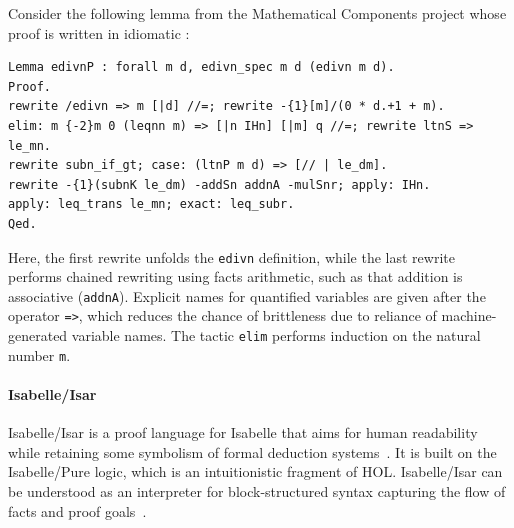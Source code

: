 Consider the following lemma from the Mathematical Components project whose proof is written in idiomatic \ssreflect:
\begin{lstlisting}[language=Coq]
Lemma edivnP : forall m d, edivn_spec m d (edivn m d).
Proof.
rewrite /edivn => m [|d] //=; rewrite -{1}[m]/(0 * d.+1 + m).
elim: m {-2}m 0 (leqnn m) => [|n IHn] [|m] q //=; rewrite ltnS => le_mn.
rewrite subn_if_gt; case: (ltnP m d) => [// | le_dm].
rewrite -{1}(subnK le_dm) -addSn addnA -mulSnr; apply: IHn.
apply: leq_trans le_mn; exact: leq_subr.
Qed.
\end{lstlisting}
Here, the first rewrite unfolds the \lstinline{edivn} definition, while the last rewrite performs chained rewriting using facts arithmetic, such as that addition is associative (\lstinline{addnA}). Explicit names for quantified variables are given after the operator \lstinline{=>}, which reduces the chance of brittleness due to reliance of machine-generated variable names. The tactic \lstinline{elim} performs induction on the natural number \lstinline{m}.

\paragraph{Isabelle/Isar}

Isabelle/Isar is a proof language for Isabelle that aims for human readability while retaining some symbolism of formal deduction systems~\citep{Wenzel2007isar}. It is built on the Isabelle/Pure logic, which is an intuitionistic fragment of HOL. Isabelle/Isar can be understood as an interpreter for block-structured syntax capturing the flow of facts and proof goals~\citep{Wenzel2006}.

